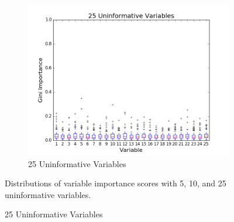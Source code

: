 \begin{figure}[H]
  \begin{subfigure}[b]{0.45\textwidth}
    \includegraphics[width=\textwidth]{figures/random_forests/rf_variable_count_bias_25.png}
    \caption{25 Uninformative Variables}
    \label{fig:var-count-25}
  \end{subfigure}
  
  Distributions of variable importance scores with 5, 10, and 25 uninformative variables.
  \label{fig:var-count}
\end{figure}

